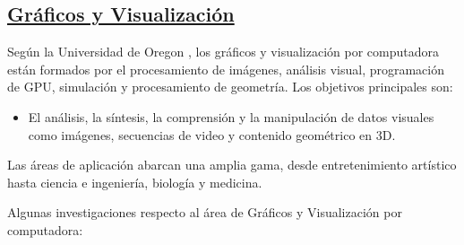 \documentclass[10pt,conference]{IEEEtran}
\begin{document}
\subsection{\underline{\textbf{Gráficos y Visualización}}}
Según la Universidad de Oregon \citep{gradef}, los gráficos y visualización por computadora están formados por el procesamiento de imágenes, análisis visual, programación de GPU, simulación y procesamiento de geometría. Los objetivos principales son:
\begin{itemize}
    \item El análisis, la síntesis, la comprensión y la manipulación de datos visuales como imágenes, secuencias de video y contenido geométrico en 3D.
\end{itemize}
Las áreas de aplicación abarcan una amplia gama, desde entretenimiento artístico hasta ciencia e ingeniería, biología y medicina.

Algunas investigaciones respecto al área de Gráficos y Visualización por computadora:
\end{document}
